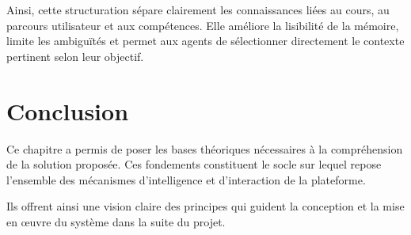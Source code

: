 Ainsi, cette structuration sépare clairement les connaissances liées au cours, au parcours utilisateur et aux compétences. Elle améliore la lisibilité de la mémoire, limite les ambiguïtés et permet aux agents de sélectionner directement le contexte pertinent selon leur objectif.


\section{Conclusion}

Ce chapitre a permis de poser les bases théoriques nécessaires à la compréhension de la solution proposée. Ces fondements constituent le socle sur lequel repose l'ensemble des mécanismes d'intelligence et d'interaction de la plateforme.

Ils offrent ainsi une vision claire des principes qui guident la conception et la mise en œuvre du système dans la suite du projet.

